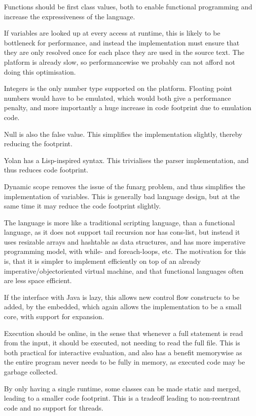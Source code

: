 \documentclass[11pt]{report}
\begin{document}
Functions should be first class values, both to enable functional programming and increase the expressiveness of the language.

If variables are looked up at every access at runtime, this is likely to be bottleneck for performance, and instead the implementation must ensure that they are only resolved once for each place they are used in the source text.
The platform is already slow, so performancewise we probably can not afford not doing this optimisation.

Integers is the only number type supported on the platform. Floating point numbers would have to be emulated, which would both give a performance penalty, and more importantly a huge increase in code footprint due to emulation code.

Null is also the false value. This simplifies the implementation slightly, thereby reducing the footprint.

Yolan has a Lisp-inspired syntax. This trivialises the parser implementation, and thus reduces code footprint.

Dynamic scope removes the issue of the funarg problem, and thus simplifies the implementation of variables. This is generally bad language design, but at the same time it may reduce the code footprint slightly.

The language is more like a traditional scripting language, than a functional language, 
as it does not support tail recursion nor has cons-list, but instead it uses resizable arrays and hashtable as data structures, and has more imperative programming model, with while- and foreach-loops, etc.
The motivation for this is, that it is simpler to implement efficiently on top of an already imperative/objectoriented virtual machine, and that functional languages often are less space efficient.

If the interface with Java is lazy, this allows new control flow constructs to be added, by the embedded, which again allows the implementation to be a small core, with support for expansion.

Execution should be online, in the sense that whenever a full statement is read from the input, it should be executed, not needing to read the full file. This is both practical for interactive evaluation, and also has a benefit memorywise as the entire program never needs to be fully in memory, as executed code may be garbage collected.

By only having a single runtime, some classes can be made static and merged, leading to a smaller code footprint. This is a tradeoff leading to non-reentrant code and no support for threads.
\end{document}
